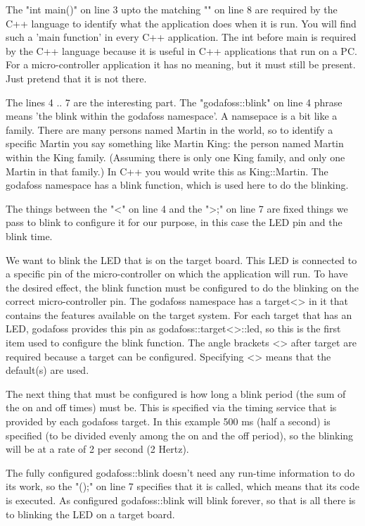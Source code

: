 \documentclass{article}
\begin{document}
The "int main(){" on line 3 upto the matching "}" on line 8 are required
by the C++ language to identify what the application does when it is run.
You will find such a 'main function' in every C++ application. 
The int before main is required by the C++ language because it is 
useful in C++ applications that run on a PC.
For a micro-controller application it has no meaning, but it must still be 
present.
Just pretend that it is not there.

The lines 4 .. 7 are the interesting part.
The "godafoss::blink" on line 4 phrase means 
'the blink within the godafoss namespace'. 
A namsepace is a bit like a family.
There are many persons named Martin in the world, so to identify a specific
Martin you say something like Martin King: the person named Martin
within the King family. 
(Assuming there is only one King family, and only one
Martin in that family.)
In C++ you would write this as King::Martin.
The godafoss namespace has a blink function, 
which is used here to do the blinking.

The things between the "<" on line 4 and the ">;" on line 7 are 
fixed things we pass to blink to configure it for our purpose,
in this case the LED pin and the blink time.

We want to blink the LED that is on the target board.
This LED is connected to a specific pin of the micro-controller
on which the application will run.
To have the desired effect, the blink function must be configured to 
do the blinking on the correct micro-controller pin. 
The godafoss namespace has a target<> in it that contains the 
features available on the target system.
For each target that has an LED, godafoss provides this pin
as godafoss::target<>::led, so this is the first item used
to configure the blink function.
The angle brackets <> after target are required because a target 
can be configured.
Specifying <> means that the default(s) are used.

The next thing that must be configured is how long a blink period
(the sum of the on and off times) must be.
This is specified via the timing service that is provided by each godafoss target.
In this example 500 ms (half a second) is specified 
(to be divided evenly among the on and the off period), 
so the blinking will be at a rate of 2 per second (2 Hertz).

The fully configured godafoss::blink doesn't need any run-time information 
to do its work, so the "();" on line 7 specifies that it is called,
which means that its code is executed.
As configured godafoss::blink will blink forever, so that
is all there is to blinking the LED on a target board.
\end{document}
